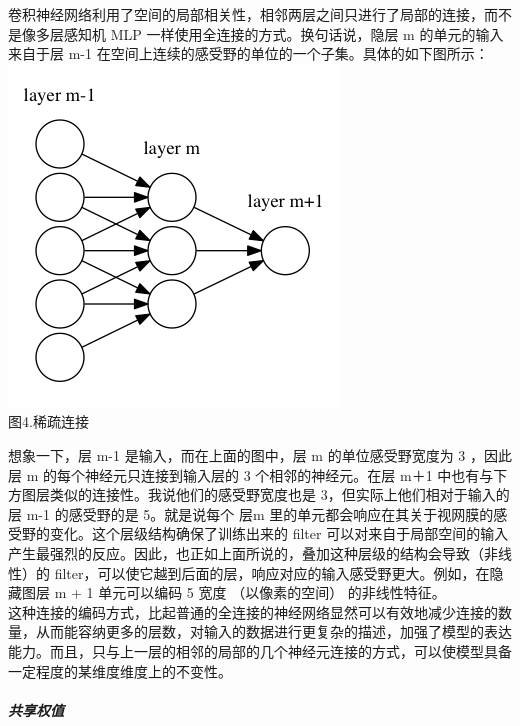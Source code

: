 卷积神经网络利用了空间的局部相关性，相邻两层之间只进行了局部的连接，而不是像多层感知机
MLP 一样使用全连接的方式。换句话说，隐层 m 的单元的输入来自于层 m-1
在空间上连续的感受野的单位的一个子集。具体的如下图所示：\\\includegraphics{picture/sparse-connectivity.png}\\图4.稀疏连接

想象一下，层 m-1 是输入，而在上面的图中，层 m 的单位感受野宽度为 3
，因此层 m 的每个神经元只连接到输入层的 3 个相邻的神经元。在层 m＋1
中也有与下方图层类似的连接性。我说他们的感受野宽度也是
3，但实际上他们相对于输入的层 m-1 的感受野的是 5。就是说每个 层m
里的单元都会响应在其关于视网膜的感受野的变化。这个层级结构确保了训练出来的
filter
可以对来自于局部空间的输入产生最强烈的反应。因此，也正如上面所说的，叠加这种层级的结构会导致（非线性）的
filter，可以使它越到后面的层，响应对应的输入感受野更大。例如，在隐藏图层
m + 1 单元可以编码 5 宽度 （以像素的空间）
的非线性特征。\\这种连接的编码方式，比起普通的全连接的神经网络显然可以有效地减少连接的数量，从而能容纳更多的层数，对输入的数据进行更复杂的描述，加强了模型的表达能力。而且，只与上一层的相邻的局部的几个神经元连接的方式，可以使模型具备一定程度的某维度维度上的不变性。

\subparagraph{共享权值}\label{ux5171ux4eabux6743ux503c}

